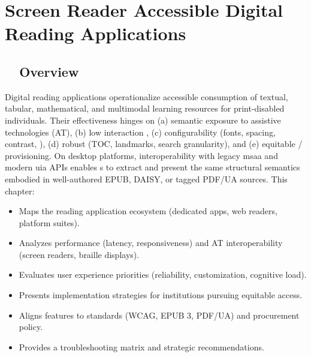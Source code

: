 \chapter{Screen Reader Accessible Digital Reading Applications}
\label{chap:reading-apps}

\section{~~Overview}
\label{sec:sr27-overview}
Digital reading applications operationalize accessible consumption of textual, tabular, mathematical, and multimodal learning resources for print-disabled individuals. Their effectiveness hinges on (a) semantic exposure to assistive technologies (AT), (b) low interaction , (c) configurability (fonts, spacing, contrast, ), (d) robust  (TOC, landmarks, search granularity), and (e) equitable / provisioning. On desktop platforms, interoperability with legacy \gls{msaa} and modern \gls{uia}  APIs enables s to extract and present the same structural semantics embodied in well-authored EPUB, DAISY, or tagged PDF/UA sources. This chapter:
\begin{itemize}
	\item Maps the reading application ecosystem (dedicated apps, web readers, platform suites).
	\item Analyzes performance (latency, responsiveness) and AT interoperability (screen readers, braille displays).
	\item Evaluates user experience priorities (reliability, customization, cognitive load).
	\item Presents implementation strategies for institutions pursuing equitable access.
	\item Aligns features to standards (WCAG, EPUB 3, PDF/UA) and procurement policy.
	\item Provides a troubleshooting matrix and strategic recommendations.
\end{itemize}

